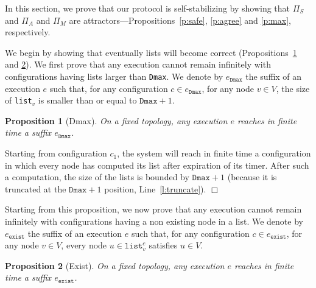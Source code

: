 \documentclass[11pt,english]{article}
\newtheorem{proposition}{Proposition}
\newenvironment{proof}[1][0cm]{
  \begin{list}{\bf Proof.~}{
      \setlength{\itemindent}{0cm}
      \setlength{\labelsep}{0cm}
      \setlength{\labelwidth}{#1}
      \setlength{\leftmargin}{#1}
    \item
    }
}{\hfill$\Box$
  \end{list}
}
\begin{document}
In this section, we prove that our protocol is self-stabilizing by showing that
$\Pi_S$ and $\Pi_A$ and $\Pi_M$ are attractors---Propo\-sitions~\ref{p:safe}, \ref{p:agree} and \ref{p:max}, respectively.



We begin by showing that eventually lists will become correct
(Propositions~\ref{p:dmax} and \ref{p:exist}).
We first prove that any execution cannot remain infinitely with configurations
having lists larger than \texttt{Dmax}. We denote by $e_\texttt{Dmax}$ the
suffix of an execution $e$ such that, for any configuration $c \in
e_\texttt{Dmax}$, for any node $v \in V$, the size of \texttt{list}$_v$ is
smaller than or equal to $\texttt{Dmax}+1$.

\begin{proposition}[Dmax]\label{p:dmax}
On a fixed topology, any execution $e$ reaches in finite time a suffix
$e_\texttt{Dmax}$.
\end{proposition}

\begin{proof}
Starting from configuration $c_1$, the system will reach in finite time a
configuration in which every node has computed its list after expiration of its
timer. After such a computation, the size of the lists is bounded by
$\texttt{Dmax}+1$ (because it is truncated at the $\texttt{Dmax}+1$ position,
Line~\ref{l:truncate}).
\end{proof}


Starting from this proposition, we now prove that any execution cannot remain
infinitely with configurations having a non existing node in a list. We denote
by $e_\texttt{exist}$ the suffix of an execution $e$ such that, for any
configuration $c \in e_\texttt{exist}$, for any node $v\in V$, every node $u \in
\texttt{list}_v^c$ satisfies $u \in V$.

\begin{proposition}[Exist]\label{p:exist}
On a fixed topology, any execution $e$ reaches in finite time a suffix
$e_\texttt{exist}$.
\end{proposition}
\end{document}
